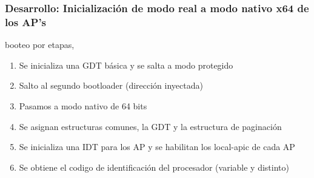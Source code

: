 \documentclass{beamer}
\begin{document}
\begin{frame}
  \frametitle{Desarrollo: \small Inicialización de modo real a modo nativo x64 de los AP's}
  booteo por etapas,\\
\vspace{10pt}
  \begin{enumerate}
    \setlength{\itemsep}{10pt}
   \item Se inicializa una GDT básica y se salta a modo protegido
   \item Salto al segundo bootloader (dirección inyectada)
   \item Pasamos a modo nativo de 64 bits
   \item Se asignan estructuras comunes, la GDT y la estructura de paginación
   \item Se inicializa una IDT para los AP y se habilitan los local-apic de cada AP
   \item Se obtiene el codigo de identificación del procesador (variable y distinto)
  \end{enumerate}


\end{frame}
\end{document}
